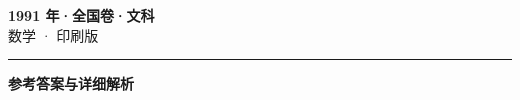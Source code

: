 \documentclass[zihao=5, a4paper]{ctexart}
\begin{document}
\begin{center}
  {\Large\bfseries 1991 年·全国卷·文科}\\[4pt]
  {\large 数学 · 印刷版}
\end{center}
\medskip
{}

\par\bigskip\hrule\bigskip
{}
\begin{center}{\large\bfseries 参考答案与详细解析}\end{center}
\smallskip

\end{document}
